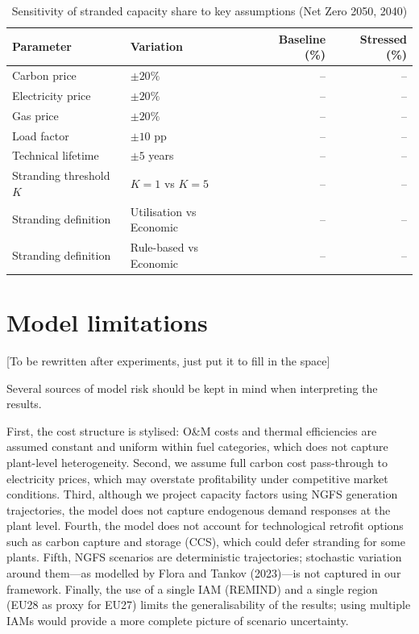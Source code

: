 \documentclass[a4paper, 12pt]{report}
\numberwithin{equation}{chapter}
\numberwithin{figure}{chapter}
\numberwithin{table}{chapter}
\begin{document}
\begin{table}[H]
\centering
\caption{Sensitivity of stranded capacity share to key assumptions (Net Zero 2050, 2040)}
\label{tab:sensitivity}
\vspace{0.2cm}
\begin{tabular}{l l r r}
\toprule
\textbf{Parameter} & \textbf{Variation} & \textbf{Baseline (\%)} & \textbf{Stressed (\%)} \\
\midrule
Carbon price             & $\pm 20\%$      & -- & -- \\
Electricity price        & $\pm 20\%$      & -- & -- \\
Gas price                & $\pm 20\%$      & -- & -- \\
Load factor              & $\pm 10$ pp     & -- & -- \\
Technical lifetime       & $\pm 5$ years   & -- & -- \\
Stranding threshold $K$  & $K=1$ vs $K=5$  & -- & -- \\
Stranding definition     & Utilisation vs Economic & -- & -- \\
Stranding definition     & Rule-based vs Economic  & -- & -- \\
\bottomrule
\end{tabular}
\end{table}



\section{Model limitations}

[To be rewritten after experiments, just put it to fill in the space]

Several sources of model risk should be kept in mind when interpreting the results.

First, the cost structure is stylised: O\&M costs and thermal efficiencies are assumed constant and uniform within fuel categories, which does not capture plant-level heterogeneity. Second, we assume full carbon cost pass-through to electricity prices, which may overstate profitability under competitive market conditions. Third, although we project capacity factors using NGFS generation trajectories, the model does not capture endogenous demand responses at the plant level. Fourth, the model does not account for technological retrofit options such as carbon capture and storage (CCS), which could defer stranding for some plants. Fifth, NGFS scenarios are deterministic trajectories; stochastic variation around them---as modelled by Flora and Tankov (2023)---is not captured in our framework. Finally, the use of a single IAM (REMIND) and a single region (EU28 as proxy for EU27) limits the generalisability of the results; using multiple IAMs would provide a more complete picture of scenario uncertainty.
\end{document}
